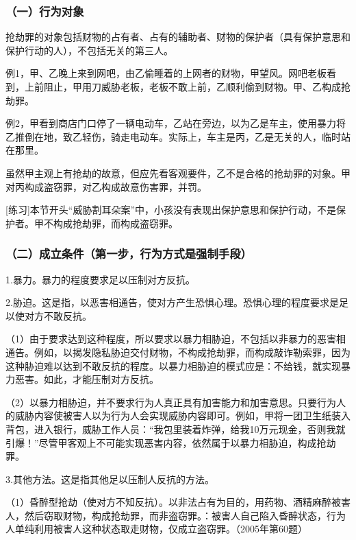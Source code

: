 
\subsubsection*{（一）行为对象}

抢劫罪的对象包括财物的占有者、占有的辅助者、财物的保护者（具有保护意思和保护行动的人），不包括无关的第三人。

例1，甲、乙晚上来到网吧，由乙偷睡着的上网者的财物，甲望风。网吧老板看到，上前阻止，甲用刀威胁老板，老板不敢上前，乙顺利偷到财物。甲、乙构成抢劫罪。

例2，甲看到商店门口停了一辆电动车，乙站在旁边，以为乙是车主，使用暴力将乙推倒在地，致乙轻伤，骑走电动车。实际上，车主是丙，乙是无关的人，临时站在那里。

虽然甲主观上有抢劫的故意，但应先看客观要件，乙不是合格的抢劫罪的对象。甲对丙构成盗窃罪，对乙构成故意伤害罪，并罚。

[练习]本节开头“威胁割耳朵案”中，小孩没有表现出保护意思和保护行动，不是保护者。甲不构成抢劫罪，而构成盗窃罪。

\subsubsection*{（二）成立条件（第一步，行为方式是强制手段）}

1.暴力。暴力的程度要求足以压制对方反抗。

2.胁迫。这是指，以恶害相通告，使对方产生恐惧心理。恐惧心理的程度要求是足以使对方不敢反抗。

（1）由于要求达到这种程度，所以要求以暴力相胁迫，不包括以非暴力的恶害相通告。例如，以揭发隐私胁迫交付财物，不构成抢劫罪，而构成敲诈勒索罪，因为这种胁迫难以达到不敢反抗的程度。以暴力相胁迫的模式应是：不给钱，就实现暴力恶害。如此，才能压制对方反抗。

（2）以暴力相胁迫，并不要求行为人真正具有加害能力和加害意思。只要行为人的威胁内容使被害人以为行为人会实现威胁内容即可。例如，甲将一团卫生纸装入背包，进入银行，威胁工作人员：“我包里装着炸弹，给我10万元现金，否则我就引爆！”尽管甲客观上不可能实现恶害内容，依然属于以暴力相胁迫，构成抢劫罪。

3.其他方法。这是指其他足以压制人反抗的方法。

（1）昏醉型抢劫（使对方不知反抗）。以非法占有为目的，用药物、酒精麻醉被害人，然后窃取财物，构成抢劫罪，而非盗窃罪。：被害人自己陷入昏醉状态，行为人单纯利用被害人这种状态取走财物，仅成立盗窃罪。（2005年第60题）

